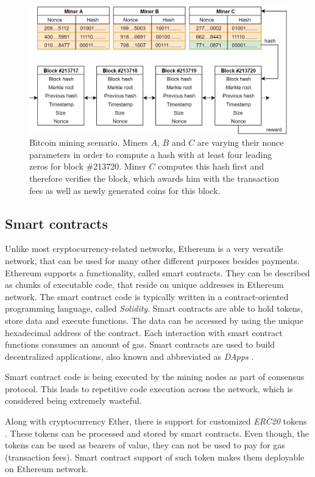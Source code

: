 \begin{figure}[H]
\centering
\includegraphics[scale=0.58]{images/miningprocess.png}
\caption{Bitcoin mining scenario. Miners $A$, $B$ and $C$ are varying their nonce parameters in order to compute a hash with at least four leading zeros for block \#213720. Miner $C$ computes this hash first and therefore verifies the block, which awards him with the transaction fees as well as newly generated coins for this block.}
\label{fig:mining}
\end{figure}

\subsection*{Smart contracts}
Unlike most cryptocurrency-related networks, Ethereum is a very versatile network, that can be used for many other different purposes besides payments. Ethereum supports a functionality, called smart contracts. They can be described as chunks of executable code, that reside on unique addresses in Ethereum network. The smart contract code is typically written in a contract-oriented programming language, called \emph{\gls{Solidity}}. Smart contracts are able to hold tokens, store data and execute functions. The data can be accessed by using the unique hexadecimal address of the contract. Each interaction with smart contract functions consumes an amount of gas. Smart contracts are used to build decentralized applications, also known and abbreviated as \textit{\glspl{DApp}} \citep{dapp}. 

Smart contract code is being executed by the mining nodes as part of consensus protocol. This leads to repetitive code execution across the network, which is considered being extremely wasteful.

Along with cryptocurrency Ether, there is support for customized \emph{\gls{ERC20}} tokens \citep{erc20}. These tokens can be processed and stored by smart contracts. Even though, the tokens can be used as bearers of value, they can not be used to pay for gas (transaction fees). Smart contract support of such token makes them deployable on Ethereum network.

